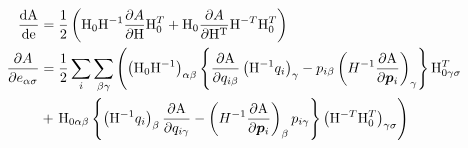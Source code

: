 \documentclass[11pt,a4paper,uplatex]{jsarticle}
\begin{document}
\begin{align}
    \frac{\rm dA}{\rm de} &= \frac{1}{2}\left({\rm H}_{0} {\rm H}^{-1} \frac{\partial A}{\partial {\rm H}} {\rm H}_{0}^{T} + {\rm H}_{0} \frac{\partial A}{\partial {\rm H^{T}}} {\rm H}^{-T}{\rm H}_{0}^{T}  \right) \\
    \frac{\partial A}{\partial e_{\alpha \sigma}} &= \frac{1}{2} \sum_{i} \sum_{\beta \gamma} \left( \left({\rm H}_{0} {\rm H}^{-1}\right)_{\alpha \beta}
     \left\{ \frac{\partial {\rm A}}{\partial q_{i \beta}} \left({\rm H}^{-1} q_{i}\right)_{\gamma}    -  p_{i \beta} \left( H^{-1} \frac{\partial {\rm A}}{\partial \bm{p}_{i}}  \right)_{\gamma} \right\} {\rm H}_{0 \gamma \sigma} ^{T}\right. \\
    &+ \left. {\rm H}_{0 \alpha \beta}  \left\{ \left({\rm H}^{-1} q_{i}\right)_{\beta} \frac{\partial {\rm A}}{\partial q_{i \gamma}}  -  \left( H^{-1} \frac{\partial {\rm A}}{\partial \bm{p}_{i}}  \right)_{\beta} p_{i \gamma} \right\}   \left({\rm H}^{-T}{\rm H}_{0}^{T} \right)_{\gamma \sigma} \right) \\
\end{align}
\end{document}
